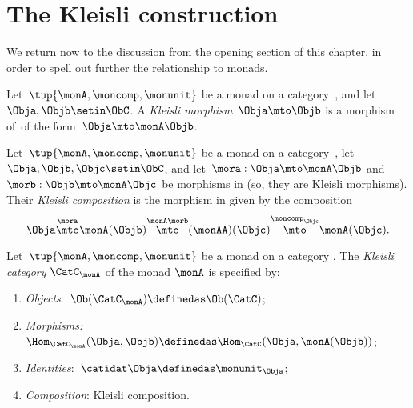 
\section{The Kleisli construction}
\label{sec:Kleisli}

We return now to the discussion from the opening section of this chapter, in order to spell out further the relationship to monads.

\begin{ctdefinition}
    \label{def:kleislimor}
    Let~$\tup{\monA, \moncomp, \monunit}$ be a monad on a category~\CatC, and let~$\Obja, \Objb \setin \ObC$.
    A
    \emph{Kleisli morphism}~$\Obja \mto \Objb$ is a morphism of~\CatC of the form~$\Obja \mto \monA \Objb$.
\end{ctdefinition}

\begin{ctdefinition}
    \label{def:kleislicomp}
    Let~$\tup{\monA, \moncomp, \monunit}$ be a monad on a category~\CatC, let~$\Obja, \Objb, \Objc \setin \ObC$,  and let~$\mora : \Obja \mto \monA \Objb$ and $\morb : \Objb \mto \monA \Objc$ be morphisms in \CatC (so, they are Kleisli morphisms).
    Their \emph{Kleisli composition} is the morphism in \CatC given by the composition
    \begin{equation}
        \Obja \overset{\mora}{\mto} \monA(\Objb) \overset{\monA \morb}{\mto} (\monAA)(\Objc) \overset{\moncomp_\Objc}{\mto} \monA(\Objc).
    \end{equation}
\end{ctdefinition}

\begin{ctdefinition}
    \label{def:kleislicat}
    Let~$\tup{\monA, \moncomp, \monunit}$ be a monad on a category \CatC.
    The \emph{Kleisli category} $\CatC_\monA$ of the monad $\monA$ is specified by:
    \begin{enumerate}
        \item \emph{Objects}:~$\Ob(\CatC_\monA) \definedas \Ob(\CatC)$;
        \item \emph{Morphisms:}~$\Hom_{\CatC_\monA}(\Obja, \Objb) \definedas \Hom_{\CatC}(\Obja, \monA(\Objb))$;
        \item \emph{Identities}:~$\catidat\Obja \definedas \monunit_\Obja$;
        \item \emph{Composition}: Kleisli composition.
    \end{enumerate}
\end{ctdefinition}

